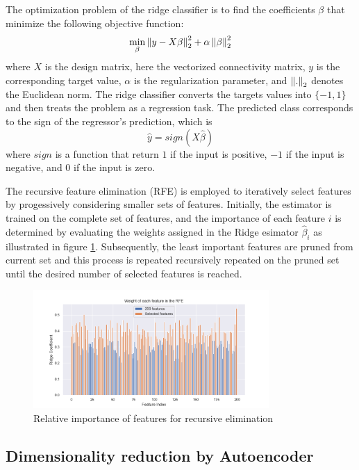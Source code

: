 The optimization problem of the ridge classifier is to find the coefficients $\beta$ that minimize the following objective function:
$$
\min_{\beta} \left\lVert y - X\beta\right\rVert_2^2 + \alpha \left\lVert\beta\right\rVert_2^2
$$
where $X$ is the design matrix, here the vectorized connectivity matrix, $y$ is the corresponding target value, $\alpha$ is the regularization parameter, and $\left\lVert.\right\rVert_2$ denotes the Euclidean norm. The ridge classifier converts the targets values into $\{-1, 1\}$ and then treats the problem as a regression task. The predicted class corresponds to the sign of the regressor's prediction, which is
$$
\hat{y} = sign(X\hat{\beta})
$$
where $sign$ is a function that return $1$ if the input is positive, $-1$ if the input is negative, and $0$ if the input is zero.

The recursive feature elimination (RFE) is employed to iteratively select features by progessively considering smaller sets of features. Initially, the estimator is trained on the complete set of features, and the importance of each feature $i$ is determined by evaluating the weights assigned in the Ridge esimator $\hat{\beta}_i$ as illustrated in figure \ref{fig:rfe}. Subsequently, the least important features are pruned from current set and this process is repeated recursively repeated on the pruned set until the desired number of selected features is reached.
\begin{figure}[t!]
    \centering
    \includegraphics[width=0.8\textwidth]{figures/rfe.png}
    \caption{Relative importance of features for recursive elimination}
    \label{fig:rfe}
    \Description{}
\end{figure}

\subsection{Dimensionality reduction by Autoencoder}


